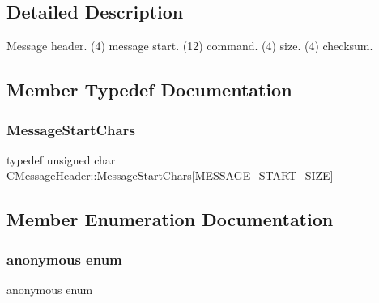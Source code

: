 \subsection{Detailed Description}
Message header. (4) message start. (12) command. (4) size. (4) checksum. 

\subsection{Member Typedef Documentation}
\mbox{\label{class_c_message_header_a0d0eeb540cbf4087973f6652ad61878f}} 
\subsubsection{\texorpdfstring{Message\+Start\+Chars}{MessageStartChars}}
{\footnotesize\ttfamily typedef unsigned char C\+Message\+Header\+::\+Message\+Start\+Chars\mbox{[}\mbox{\hyperlink{protocol_8h_a6bcadada595cc3da13e6a04be1715917}{M\+E\+S\+S\+A\+G\+E\+\_\+\+S\+T\+A\+R\+T\+\_\+\+S\+I\+ZE}}\mbox{]}}



\subsection{Member Enumeration Documentation}
\mbox{\label{class_c_message_header_a44037297cb6e6b432e2386c351ce05dd}} 
\subsubsection{\texorpdfstring{anonymous enum}{anonymous enum}}
{\footnotesize\ttfamily anonymous enum}

